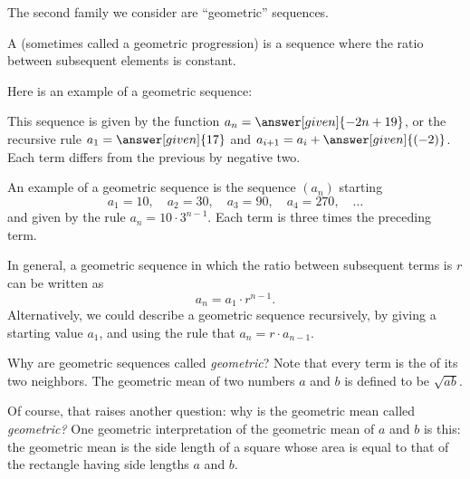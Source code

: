 \documentclass{ximera}
\begin{document}
The second family we consider are ``geometric'' sequences.

\begin{definition}
  A  (sometimes called a geometric
  progression) is a sequence where the
  ratio between subsequent elements is constant.
\end{definition}



\begin{example}
  Here is an example of a geometric sequence:
  \begin{image}
  \end{image}
  This sequence is given by the function $a_n=\answer[given]{-2n + 19}$, or
  the recursive rule $a_1 = \answer[given]{17}$ and $a_{i+1} = a_i +
  \answer[given]{(-2)}$. Each term differs from the previous by negative
  two.
\end{example}
\begin{example}
  An example of a geometric sequence is the sequence $(a_n)$ starting
  $$
  a_1 = 10, \quad a_2 = 30, \quad a_3 = 90, \quad a_4 = 270, \quad\ldots
  $$
  and given by the rule $a_n = 10 \cdot 3^{n-1}$.  Each term is three
  times the preceding term.
\end{example}

In general, a geometric sequence in which the ratio between
subsequent terms is $r$ can be written as
$$
a_n = a_1 \cdot r^{n-1}.
$$
Alternatively, we could describe a geometric sequence
recursively, by giving a starting value $a_1$, and using the rule that
$a_{n} = r \cdot a_{n-1}$.

\begin{remark}
Why are geometric sequences called \textit{geometric}?  Note that
every term is the  of its two neighbors.  The
geometric mean of two numbers $a$ and $b$ is defined to be
$\sqrt{ab}$.

Of course, that raises another question: why is the geometric mean
called \textit{geometric?}  One geometric interpretation of the
geometric mean of $a$ and $b$ is this: the geometric mean is the side
length of a square whose area is equal to that of the rectangle having
side lengths $a$ and $b$.
\end{remark}
\end{document}

